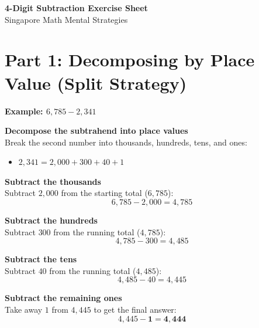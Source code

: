 \documentclass{article}
\newcommand{\stepnum}[2]{%
  \tikzmarknode{#2}{%
    \begin{tikzpicture}[baseline=(char.base)]
      \node[draw=textlight, circle, inner sep=1.5pt, font=\sffamily\small] (char) {#1};
    \end{tikzpicture}%
  }%
}
\begin{document}
\sffamily

\begin{center}
  {\Huge \bfseries 4-Digit Subtraction Exercise Sheet} \\[0.4em]
  {\Large \textcolor{subtext}{Singapore Math Mental Strategies}}
\end{center}
\vspace{1em}

\section*{Part 1: Decomposing by Place Value (Split Strategy)}
{\Large \textbf{Example: $6,785 - 2,341$}}
\vspace{0.5em}

\begin{description}[leftmargin=2em]

  \item[\stepnum{1}{p1s1}] \textbf{Decompose the subtrahend into place values}\\[0.2em]
  Break the second number into thousands, hundreds, tens, and ones:
  \begin{itemize}
    \item $2,341 = 2,000 + 300 + 40 + 1$
  \end{itemize}
  \vspace{0.6em}

  \item[\stepnum{2}{p1s2}] \textbf{Subtract the thousands}\\[0.4em]
  Subtract $2,000$ from the starting total ($6,785$):
  \[
    6,785 - 2,000 = 4,785
  \]
  \vspace{0.6em}

  \item[\stepnum{3}{p1s3}] \textbf{Subtract the hundreds}\\[0.4em]
  Subtract $300$ from the running total ($4,785$):
  \[
    4,785 - 300 = 4,485
  \]
  \vspace{0.6em}

  \item[\stepnum{4}{p1s4}] \textbf{Subtract the tens}\\[0.4em]
  Subtract $40$ from the running total ($4,485$):
  \[
    4,485 - 40 = 4,445
  \]
  \vspace{0.6em}

  \item[\stepnum{5}{p1s5}] \textbf{Subtract the remaining ones}\\[0.4em]
  Take away $1$ from $4,445$ to get the final answer:
  \[
    4,445 - \mathbf{1} = \mathbf{4,444}
  \]

\end{description}
\end{document}
